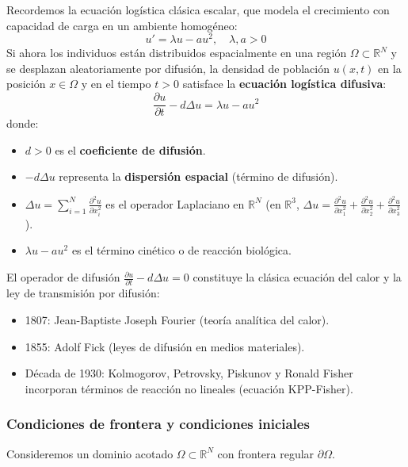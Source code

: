 Recordemos la ecuación logística clásica escalar, que modela el crecimiento con capacidad de carga en un ambiente homogéneo:
\[
    u' = \lambda u - a u^2, \quad \lambda, a > 0
\]
Si ahora los individuos están distribuidos espacialmente en una región $\Omega \subset \mathbb{R}^N$ y se desplazan aleatoriamente por difusión, la densidad de población $u(x, t)$ en la posición $x \in \Omega$ y en el tiempo $t > 0$ satisface la \textbf{ecuación logística difusiva}:
\[
    \frac{\partial u}{\partial t} - d \Delta u = \lambda u - a u^2
\]
donde:
\begin{itemize}
    \item $d > 0$ es el \textbf{coeficiente de difusión}.
    \item $-d \Delta u$ representa la \textbf{dispersión espacial} (término de difusión).
    \item $\Delta u = \sum_{i=1}^N \frac{\partial^2 u}{\partial x_i^2}$ es el operador Laplaciano en $\mathbb{R}^N$ (en $\mathbb{R}^3$, $\Delta u = \frac{\partial^2 u}{\partial x_1^2} + \frac{\partial^2 u}{\partial x_2^2} + \frac{\partial^2 u}{\partial x_3^2}$).
    \item $\lambda u - a u^2$ es el término cinético o de reacción biológica.
\end{itemize}

\begin{observación}
    El operador de difusión $\frac{\partial u}{\partial t} - d \Delta u = 0$ constituye la clásica ecuación del calor y la ley de transmisión por difusión:
    \begin{itemize}
        \item 1807: Jean-Baptiste Joseph Fourier (teoría analítica del calor).
        \item 1855: Adolf Fick (leyes de difusión en medios materiales).
        \item Década de 1930: Kolmogorov, Petrovsky, Piskunov y Ronald Fisher incorporan términos de reacción no lineales (ecuación KPP-Fisher).
    \end{itemize}
\end{observación}

\subsubsection{Condiciones de frontera y condiciones iniciales}

Consideremos un dominio acotado $\Omega \subset \mathbb{R}^N$ con frontera regular $\partial \Omega$.

